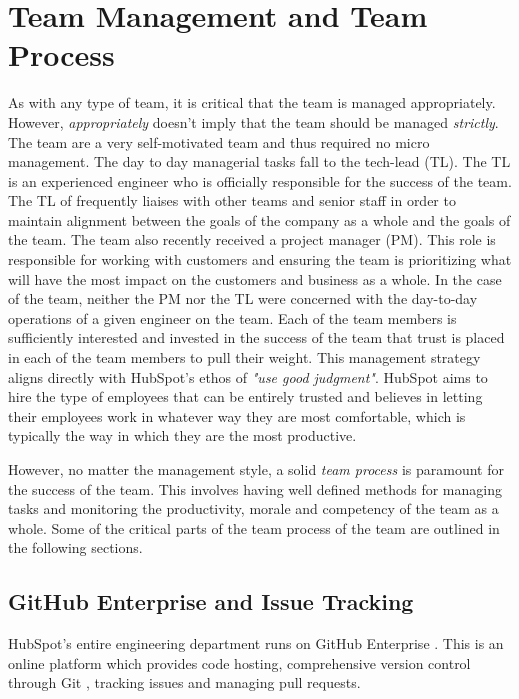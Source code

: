 \chapter{Team Management and Team Process}
As with any type of team, it is critical that the team is managed appropriately. However, \textit{appropriately} doesn't imply that the team should be managed \textit{strictly}. The \team{} team are a very self-motivated team and thus required no micro management. The day to day managerial tasks fall to the tech-lead (TL). The TL is an experienced engineer who is officially responsible for the success of the team. The TL of \team{} frequently liaises with other teams and senior staff in order to maintain alignment between the goals of the company as a whole and the goals of the team. The \team{} team also recently received a project manager (PM). This role is responsible for working with customers and ensuring the team is prioritizing what will have the most impact on the customers and business as a whole. In the case of the \team{} team, neither the PM nor the TL were concerned with the day-to-day operations of a given engineer on the team. Each of the team members is sufficiently interested and invested in the success of the team that trust is placed in each of the team members to pull their weight. This management strategy aligns directly with HubSpot's ethos of \textit{"use good judgment"}. HubSpot aims to hire the type of employees that can be entirely trusted and believes in letting their employees work in whatever way they are most comfortable, which is typically the way in which they are the most productive.

However, no matter the management style, a solid \textit{team process} is paramount for the success of the team. This involves having well defined methods for managing tasks and monitoring the productivity, morale and competency of the team as a whole. Some of the critical parts of the team process of the \team{} team are outlined in the following sections.

\section{GitHub Enterprise and Issue Tracking}\label{sec:issueTracking}
HubSpot's entire engineering department runs on GitHub Enterprise \cite{githubEnterp}. This is an online platform which provides code hosting, comprehensive version control through Git \cite{git}, tracking issues and managing pull requests. 

